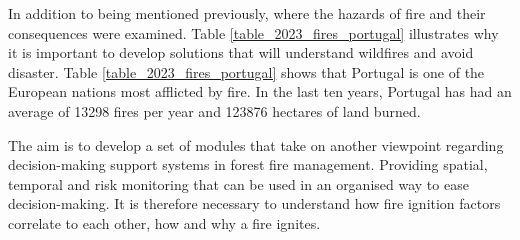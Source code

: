 In addition to being mentioned previously, where the hazards of fire and their consequences were examined. Table \ref{table_2023_fires_portugal} illustrates why it is important to develop solutions that will understand wildfires and avoid disaster. Table \ref{table_2023_fires_portugal} shows that Portugal is one of the European nations most afflicted by fire. In the last ten years, Portugal has had an average of 13298 fires per year and 123876 hectares of land burned. 


The aim is to develop a set of modules that take on another viewpoint regarding decision-making support systems in forest fire management. Providing spatial, temporal and risk monitoring that can be used in an organised way to ease decision-making. It is therefore necessary to understand how fire ignition factors correlate to each other, how and why a fire ignites.






\begin{table}[h!]
\caption{Number of rural fires and corresponding extent of burnt area in mainland Portugal, per year, between 1 January and 15 October 2023 January and 15 October 2023 \cite{icnf2023report}}
\centering
{}
\label{table_2023_fires_portugal}
\end{table}

